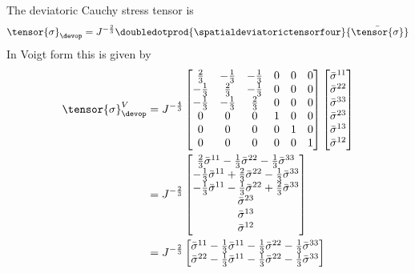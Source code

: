 The deviatoric Cauchy stress tensor is
\begin{equation}
  \tensor{\sigma}_{\devop}=J^{-\frac{2}{3}}\doubledotprod{\spatialdeviatorictensorfour}{\bar{\tensor{\sigma}}}
\end{equation}
In Voigt form this is given by
\begin{equation}
  \begin{split}
    \tensor{\sigma}_{\devop}^{V}&=J^{-\frac{4}{3}}\begin{bmatrix}
      \frac{2}{3} & -\frac{1}{3} & -\frac{1}{3} & 0 & 0 & 0\\
      -\frac{1}{3} & \frac{2}{3} & -\frac{1}{3} & 0 & 0 & 0\\
      -\frac{1}{3} & -\frac{1}{3} & \frac{2}{3} & 0 & 0 & 0\\
      0 & 0 & 0 & 1 & 0 & 0 \\
      0 & 0 & 0 & 0 & 1 & 0 \\
      0 & 0 & 0 & 0 & 0 & 1
    \end{bmatrix}\begin{bmatrix}
      \bar{\sigma}^{11} \\
      \bar{\sigma}^{22} \\
      \bar{\sigma}^{33} \\
      \bar{\sigma}^{23} \\
      \bar{\sigma}^{13} \\
      \bar{\sigma}^{12}
    \end{bmatrix} \\
    &=J^{-\frac{2}{3}}\begin{bmatrix}
      \frac{2}{3}\bar{\sigma}^{11}-\frac{1}{3}\bar{\sigma}^{22}-\frac{1}{3}\bar{\sigma}^{33} \\
      -\frac{1}{3}\bar{\sigma}^{11}+\frac{2}{3}\bar{\sigma}^{22}-\frac{1}{3}\bar{\sigma}^{33} \\
      -\frac{1}{3}\bar{\sigma}^{11}-\frac{1}{3}\bar{\sigma}^{22}+\frac{2}{3}\bar{\sigma}^{33} \\
      \bar{\sigma}^{23} \\
      \bar{\sigma}^{13} \\
      \bar{\sigma}^{12}
    \end{bmatrix} \\
    &=J^{-\frac{2}{3}}\begin{bmatrix}
      \bar{\sigma}^{11}-\frac{1}{3}\bar{\sigma}^{11}-\frac{1}{3}\bar{\sigma}^{22}-\frac{1}{3}\bar{\sigma}^{33} \\
      \bar{\sigma}^{22}-\frac{1}{3}\bar{\sigma}^{11}-\frac{1}{3}\bar{\sigma}^{22}-\frac{1}{3}\bar{\sigma}^{33} \\

\end{bmatrix}
\end{split}
\end{equation}
